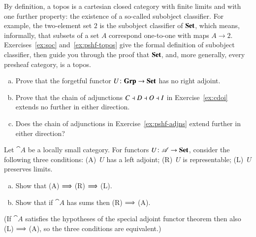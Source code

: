 By definition, a topos is a cartesian closed category with finite limits
and with one further property: the existence of a so-called subobject%
%
%
classifier.  For example, the two-element%
%
%
set $2$ is the subobject classifier of $\mathbf{Set}$, which means, informally,
that subsets of a set $A$ correspond one-to-one with maps $A \to 2$.
Exercises~\ref{ex:soc} and~\ref{ex:pshf-topos} give the formal definition
of subobject classifier, then guide you through the proof that $\mathbf{Set}$, and,
more generally, every presheaf category, is a topos.%
%
%
%


\exs


\begin{question}        
\label{ex:no-adjt}
\begin{enumerate}[(b)]
\item 
Prove that the forgetful functor $U\from \Grp \to \Set$ has no right
adjoint.

\item 
Prove that the chain of adjunctions $C \dashv D \dashv O \dashv I$%
%
%
in Exercise~\ref{ex:cdoi} extends no further in either direction.

\item
Does the chain of adjunctions in Exercise~\ref{ex:pshf-adjns} extend
further in either direction?
\end{enumerate}
\end{question}


\begin{question}
Let $\cat{A}$ be a locally small category.  For functors $U\from \cat{A}
\to \Set$, consider the following three conditions: (A)~$U$ has a left
adjoint; (R)~$U$ is representable; (L)~$U$ preserves limits.  
% 
\begin{enumerate}[(b)]
\item 
Show that (A) $\Longrightarrow$ (R) $\Longrightarrow$ (L).

\item 
Show that if $\cat{A}$ has sums then (R) $\Longrightarrow$ (A).%
%
%
\end{enumerate}
% 
(If $\cat{A}$ satisfies the hypotheses of the special adjoint functor
theorem then also (L) $\Longrightarrow$ (A), so the three conditions are
equivalent.)
\end{question}


